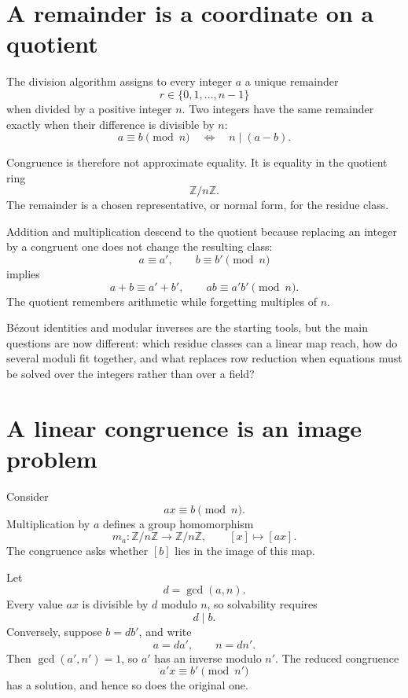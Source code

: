 
\section{A remainder is a coordinate on a quotient}

The division algorithm assigns to every integer \(a\) a unique remainder
\[
  r\in\{0,1,\ldots,n-1\}
\]
when divided by a positive integer \(n\).  Two integers have the same remainder exactly when their difference is divisible by \(n\):
\[
  a\equiv b\pmod n
  \quad\Longleftrightarrow\quad
  n\mid(a-b).
\]

Congruence is therefore not approximate equality.  It is equality in the quotient ring
\[
  \mathbb Z/n\mathbb Z.
\]
The remainder is a chosen representative, or normal form, for the residue class.

Addition and multiplication descend to the quotient because replacing an integer by a congruent one does not change the resulting class:
\[
  a\equiv a',
  \qquad
  b\equiv b'\pmod n
\]
implies
\[
  a+b\equiv a'+b',
  \qquad
  ab\equiv a'b'\pmod n.
\]
The quotient remembers arithmetic while forgetting multiples of \(n\).

Bézout identities and modular inverses are the starting tools, but the main questions are now different: which residue classes can a linear map reach, how do several moduli fit together, and what replaces row reduction when equations must be solved over the integers rather than over a field?

\section{A linear congruence is an image problem}

Consider
\[
  ax\equiv b\pmod n.
\]
Multiplication by \(a\) defines a group homomorphism
\[
  m_a:\mathbb Z/n\mathbb Z
  \longrightarrow
  \mathbb Z/n\mathbb Z,
  \qquad
  [x]\longmapsto[ax].
\]
The congruence asks whether \([b]\) lies in the image of this map.

Let
\[
  d=\gcd(a,n).
\]
Every value \(ax\) is divisible by \(d\) modulo \(n\), so solvability requires
\[
  d\mid b.
\]
Conversely, suppose \(b=db'\), and write
\[
  a=da',
  \qquad
  n=dn'.
\]
Then \(\gcd(a',n')=1\), so \(a'\) has an inverse modulo \(n'\).  The reduced congruence
\[
  a'x\equiv b'\pmod{n'}
\]
has a solution, and hence so does the original one.

